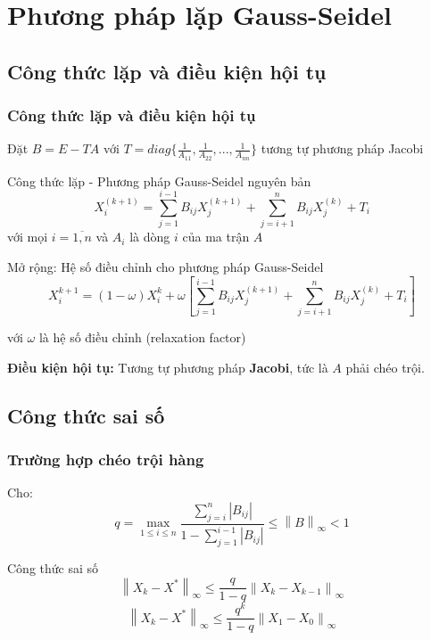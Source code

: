 \section{Phương pháp lặp Gauss-Seidel}
\subsection{Công thức lặp và điều kiện hội tụ }
    \begin{frame}
        \frametitle{Công thức lặp và điều kiện hội tụ}

        Đặt $B = E - TA$ với $T = diag\{\frac{1}{A_{11}}, \frac{1}{A_{22}},..., \frac{1}{A_{nn}}\} $ tương tự phương pháp Jacobi
        \begin{block}{Công thức lặp - Phương pháp Gauss-Seidel nguyên bản \cite{giaotrinhgiaitichso}}
            $$ X_{i}^{(k+1)} = \sum\limits_{j=1}^{i-1} B_{ij}X_{j}^{(k+1)} + \sum\limits_{j=i+1}^{n} B_{ij}X_{j}^{(k)} + T_{i}$$
            với mọi $i = \overline{1,n}$ và $A_{i}$ là dòng $i$ của ma trận $A$
        \end{block}

        \begin{block}{Mở rộng: Hệ số điều chỉnh cho phương pháp Gauss-Seidel \cite{nummethod4}}
            $$ X_{i}^{k+1} = (1 - \omega)X_{i}^{k} + \omega\left[ \sum\limits_{j=1}^{i-1} B_{ij}X_{j}^{(k+1)} + \sum\limits_{j=i+1}^{n} B_{ij}X_{j}^{(k)} + T_{i}\right] $$

            với $\omega$ là hệ số điều chỉnh (relaxation factor)
        \end{block}

        \par \textbf{Điều kiện hội tụ:} Tương tự phương pháp \textbf{Jacobi}, tức là $A$ phải chéo trội.
        
    \end{frame}

\subsection{Công thức sai số}
    \begin{frame}
        \frametitle{Trường hợp chéo trội hàng}
        Cho: 
        $$ q = \max\limits_{1 \leq i \leq n} \frac{\sum\limits_{j=i}^{n} \left\lvert B_{ij} \right\rvert}{1 - \sum\limits_{j=1}^{i-1} \left\lvert B_{ij} \right\rvert} \leq \left\lVert B \right\rVert_{\infty} < 1 $$
        
        \begin{block}{Công thức sai số \cite{giaotrinhgiaitichso}}
            $$ \left\lVert X_{k} - X^{*} \right\rVert_{\infty} \leq \frac{q}{1 - q} \left\lVert X_{k} - X_{k - 1} \right\rVert_{\infty}  $$
            $$ \left\lVert X_{k} - X^{*} \right\rVert_{\infty} \leq \frac{q^{k}}{1 - q} \left\lVert X_{1} - X_{0} \right\rVert_{\infty}  $$
        \end{block}
    \end{frame}

